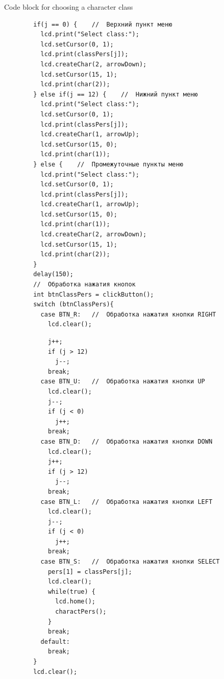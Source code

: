 \documentclass[12pt,a4paper,mathserif]{beamer}
\begin{document}
\begin{frame}[fragile]{{\small Code block for choosing a character class}}
    \begin{adjustbox}{width=\textwidth,height=\someheight,keepaspectratio}
    \begin{minipage}{1.1\linewidth}
    \begin{verbatim}
        if(j == 0) {    //  Верхний пункт меню
          lcd.print("Select class:");
          lcd.setCursor(0, 1);
          lcd.print(classPers[j]);
          lcd.createChar(2, arrowDown);
          lcd.setCursor(15, 1);
          lcd.print(char(2));
        } else if(j == 12) {    //  Нижний пункт меню
          lcd.print("Select class:");
          lcd.setCursor(0, 1);
          lcd.print(classPers[j]);
          lcd.createChar(1, arrowUp);
          lcd.setCursor(15, 0);
          lcd.print(char(1));
        } else {    //  Промежуточные пункты меню
          lcd.print("Select class:");
          lcd.setCursor(0, 1);
          lcd.print(classPers[j]);
          lcd.createChar(1, arrowUp);
          lcd.setCursor(15, 0);
          lcd.print(char(1));
          lcd.createChar(2, arrowDown);
          lcd.setCursor(15, 1);
          lcd.print(char(2));
        }
        delay(150);
        //  Обработка нажатия кнопок
        int btnClassPers = clickButton();
        switch (btnClassPers){
          case BTN_R:   //  Обработка нажатия кнопки RIGHT
            lcd.clear();
    \end{verbatim}
    \end{minipage}
    \hfill
    \begin{minipage}{1.1\linewidth}
    \begin{verbatim}
            j++;
            if (j > 12)
              j--;
            break;
          case BTN_U:   //  Обработка нажатия кнопки UP
            lcd.clear();
            j--;
            if (j < 0)
              j++;
            break;
          case BTN_D:   //  Обработка нажатия кнопки DOWN
            lcd.clear();
            j++;
            if (j > 12)
              j--;
            break;
          case BTN_L:   //  Обработка нажатия кнопки LEFT
            lcd.clear();
            j--;
            if (j < 0)
              j++;
            break;
          case BTN_S:   //  Обработка нажатия кнопки SELECT
            pers[1] = classPers[j];
            lcd.clear();
            while(true) {
              lcd.home();
              charactPers();
            }
            break;
          default:
            break;
        }
        lcd.clear();
    \end{verbatim}
    \end{minipage}
    \end{adjustbox}
\end{frame}
\end{document}
